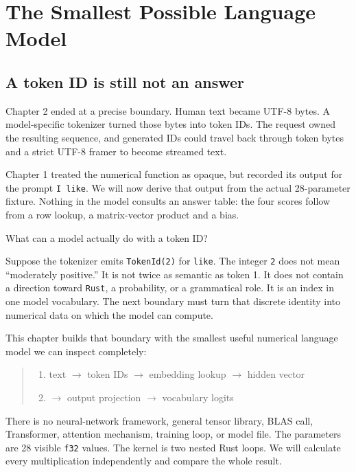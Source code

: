 \chapter{The Smallest Possible Language Model}\label{chapter-3-the-smallest-possible-language-model}
\section{A token ID is still not an
answer}\label{a-token-id-is-still-not-an-answer}

Chapter 2 ended at a precise boundary. Human text became UTF-8 bytes. A
model-specific tokenizer turned those bytes into token IDs. The request
owned the resulting sequence, and generated IDs could travel back
through token bytes and a strict UTF-8 framer to become streamed text.

Chapter 1 treated the numerical function as opaque, but recorded its output
for the prompt \texttt{I like}. We will now derive that output from the
actual 28-parameter fixture. Nothing in the model consults an answer table:
the four scores follow from a row lookup, a matrix-vector product and a bias.

What can a model actually do with a token ID?

Suppose the tokenizer emits \texttt{TokenId(2)} for \texttt{like}. The
integer \texttt{2} does not mean ``moderately positive.'' It is not
twice as semantic as token 1. It does not contain a direction toward
\texttt{Rust}, a probability, or a grammatical role. It is an index in
one model vocabulary. The next boundary must turn that discrete identity
into numerical data on which the model can compute.

This chapter builds that boundary with the smallest useful numerical
language model we can inspect completely:

\begin{quote}
\begin{enumerate}
\item text  \(\longrightarrow\)  token IDs  \(\longrightarrow\)  embedding lookup  \(\longrightarrow\)  hidden vector
\item \(\longrightarrow\)  output projection  \(\longrightarrow\)  vocabulary logits
\end{enumerate}
\end{quote}

There is no neural-network framework, general tensor library, BLAS call,
Transformer, attention mechanism, training loop, or model file. The
parameters are 28 visible \texttt{f32} values. The kernel is two nested
Rust loops. We will calculate every multiplication independently and
compare the whole result.

